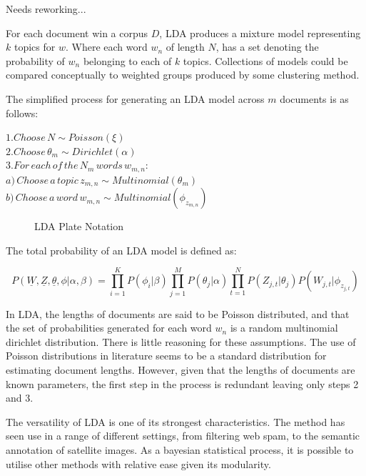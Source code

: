 \documentclass[10pt]{report}
\begin{document}
{\hspace*{40mm}Needs reworking...}

For each document win a corpus \(D\), LDA produces a mixture model representing  \(k\) topics for \(w\). Where each word \(w_n\) of length \(N\), has a set denoting the probability of \(w_n\) belonging to each of \(k\) topics. Collections of models could be compared conceptually to weighted groups produced by some clustering method.

\renewcommand{\baselinestretch}{1.5}\normalsize
The simplified process for generating an LDA model across \(m\) documents is as follows:

\renewcommand{\baselinestretch}{1.0}\normalsize
\(1. Choose\, N \sim Poisson(\xi)\)\\
\(2. Choose\, \theta_m \sim Dirichlet(\alpha)\)\\
\(3. For\, each\, of\, the\, N_m\, words\, w_{m,n}:\)\\
{\hspace*{15mm} \(a)\, Choose\, a\, topic\, z_{m,n} \sim Multinomial(\theta_m)  \)}\\
{\hspace*{15mm} \(b)\, Choose\, a\, word\, w_{m,n} \sim Multinomial(\phi_{z_{m,n}}) \)}\\

\begin{figure}[h!]
  \caption{LDA Plate Notation\label{fig:lda_plate_notation}}
\end{figure}
\renewcommand{\baselinestretch}{2.0}\normalsize

\renewcommand{\baselinestretch}{1.0}\normalsize
The total probability of an LDA model is defined as:

\[
  P(\underline{W},\underline{Z},\underline{\theta},\phi|\alpha,\beta) = \prod^{K}_{i=1} P(\phi_i|\beta) \prod^{M}_{j=1} P(\theta_j|\alpha)\prod^{N}_{t=1} P(Z_{j,t} | \theta_j)P(W_{j,t} | \phi_{z_{j,t}})
\]

\renewcommand{\baselinestretch}{2.0}\normalsize
In LDA, the lengths of documents are said to be Poisson distributed, and that the set of probabilities  generated for each word \(w_n\) is a random multinomial dirichlet distribution. There is little reasoning for these assumptions. The use of Poisson distributions in literature seems to be a standard distribution for estimating document lengths. However, given that the lengths of documents are known parameters, the first step in the process is redundant leaving only steps 2 and 3.

The versatility of LDA is one of its strongest characteristics. The method has seen use in a range of different settings, from filtering web spam, to the semantic annotation of satellite images. As a bayesian statistical process, it is possible to utilise other methods with relative ease given its modularity.
\end{document}

